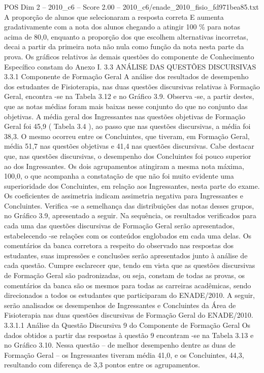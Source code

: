 \begin{textsample}{POS Dim 2 – 2010\_c6 – Score 2.00 – 2010\_c6/enade\_2010\_fisio\_fd971bea85.txt}
A proporção de alunos que selecionaram a resposta correta E aumenta gradativamente com a nota dos alunos chegando a atingir 100 \% para notas acima de 80,0, enquanto a proporção dos que escolhem alternativas incorretas, decai a partir da primeira nota não nula como função da nota nesta parte da prova.
Os gráficos relativos às demais questões do componente de Conhecimento Específico constam do Anexo I. 3.3 ANÁLISE DAS QUESTÕES DISCURSIVAS 3.3.1 Componente de Formação Geral A análise dos resultados de desempenho dos estudantes de Fisioterapia, nas duas questões discursivas relativas à Formação Geral, encontra -se na Tabela 3.12 e no Gráfico 3.9.
Observa -se, a partir destes, que as notas médias foram mais baixas nesse conjunto do que no conjunto das objetivas.
A média geral dos Ingressantes nas questões objetivas de Formação Geral foi 45,9 ( Tabela 3.4 ), ao passo que nas questões discursivas, a média foi 38,3.
O mesmo ocorreu entre os Concluintes, que tiveram, em Formação Geral, média 51,7 nas questões objetivas e 41,4 nas questões discursivas.
Cabe destacar que, nas questões discursivas, o desempenho dos Concluintes foi pouco superior ao dos Ingressantes.
Os dois agrupamentos atingiram a mesma nota máxima, 100,0, o que acompanha a constatação de que não foi muito evidente uma superioridade dos Concluintes, em relação aos Ingressantes, nesta parte do exame.
Os coeficientes de assimetria indicam assimetria negativa para Ingressantes e Concluintes.
Verifica -se a semelhança das distribuições das notas desses grupos, no Gráfico 3.9, apresentado a seguir.
Na sequência, os resultados verificados para cada uma das questões discursivas de Formação Geral serão apresentados, estabelecendo -se relações com os conteúdos englobados em cada uma delas.
Os comentários da banca corretora a respeito do observado nas respostas dos estudantes, suas impressões e conclusões serão apresentados junto à análise de cada questão.
Cumpre esclarecer que, tendo em vista que as questões discursivas de Formação Geral são padronizadas, ou seja, constam de todas as provas, os comentários da banca são os mesmos para todas as carreiras acadêmicas, sendo direcionados a todos os estudantes que participaram do ENADE/2010.
A seguir, serão analisados os desempenhos de Ingressantes e Concluintes da Área de Fisioterapia nas duas questões discursivas de Formação Geral do ENADE/2010. 3.3.1.1 Análise da Questão Discursiva 9 do Componente de Formação Geral Os dados obtidos a partir das respostas à questão 9 encontram -se na Tabela 3.13 e no Gráfico 3.10.
Nessa questão – de melhor desempenho dentre as duas de Formação Geral – os Ingressantes tiveram média 41,0, e os Concluintes, 44,3, resultando com diferença de 3,3 pontos entre os agrupamentos.

\end{textsample}
